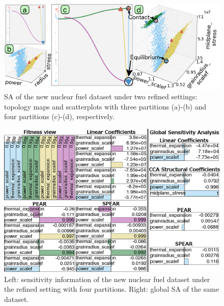 \begin{figure}[htbp]
  \centering
  \includegraphics[width=\linewidth]{figs/chap6/bisonRefined3}
  \caption{
  SA of the new nuclear fuel dataset under two refined settings:
  topology maps and scatterplots with three partitions (a)-(b) and four partitions (c)-(d), respectively.}
  \label{fig:bisonRefined}
\end{figure}

\begin{figure}[htbp]
  \centering
  \includegraphics[width=.48\textwidth]{figs/chap6/bisonRefinedSensitivity2}
  \caption{
  Left: sensitivity information of the new nuclear fuel dataset under the refined setting with four partitions.
  Right: global SA of the same dataset.
  }
  \label{fig:bisonRefined_sensitivity}
\end{figure}

